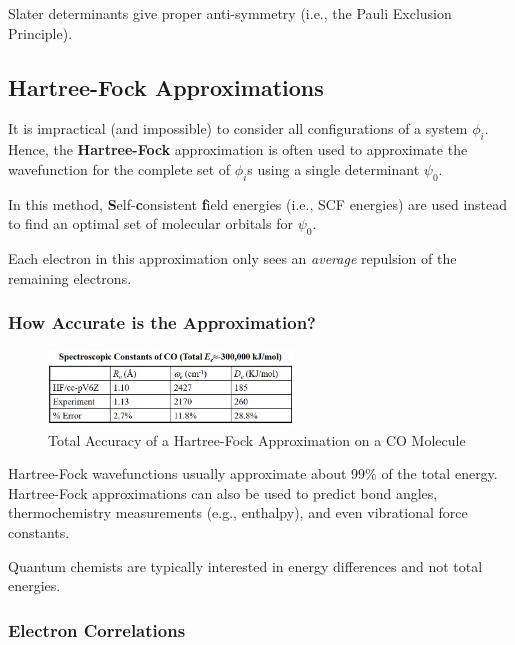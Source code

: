 \documentclass[
  letterpaper,
  DIV=11,
  numbers=noendperiod]{scrreprt}
\begin{document}
Slater determinants give proper anti-symmetry (i.e., the Pauli Exclusion
Principle).

\hypertarget{hartree-fock-approximations}{%
\subsection{Hartree-Fock
Approximations}\label{hartree-fock-approximations}}

It is impractical (and impossible) to consider all configurations of a
system \(\phi_i\). Hence, the \textbf{Hartree-Fock} approximation is
often used to approximate the wavefunction for the complete set of
\(\phi_i\)s using a single determinant \(\psi_0\).

In this method, \textbf{S}elf-\textbf{c}onsistent \textbf{f}ield
energies (i.e., SCF energies) are used instead to find an optimal set of
molecular orbitals for \(\psi_0\).

Each electron in this approximation only sees an \emph{average}
repulsion of the remaining electrons.

\hypertarget{how-accurate-is-the-approximation}{%
\subsubsection{How Accurate is the
Approximation?}\label{how-accurate-is-the-approximation}}

\begin{figure}

{\centering \includegraphics[width=2.56in,height=\textheight]{./images/wk2a/fock.jpg}

}

\caption{Total Accuracy of a Hartree-Fock Approximation on a CO
Molecule}

\end{figure}

Hartree-Fock wavefunctions usually approximate about 99\% of the total
energy. Hartree-Fock approximations can also be used to predict bond
angles, thermochemistry measurements (e.g., enthalpy), and even
vibrational force constants.

Quantum chemists are typically interested in energy differences and not
total energies.

\hypertarget{electron-correlations}{%
\subsubsection{Electron Correlations}\label{electron-correlations}}
\end{document}
